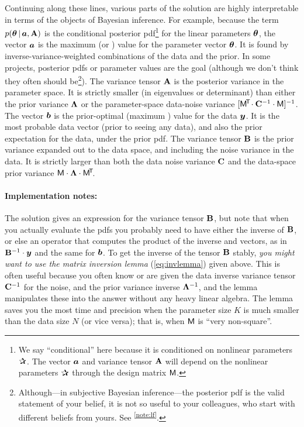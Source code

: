 Continuing along these lines,
various parts of the solution are highly interpretable in terms of the
objects of Bayesian inference. For example, because the term $p(\boldsymbol{\theta}\,|\,
\boldsymbol{a},\mathbf{A})$ is the conditional posterior pdf\footnote{We say ``conditional'' here
  because it is conditioned on nonlinear parameters $\bP$.
  The vector $\boldsymbol{a}$ and variance tensor
  $\mathbf{A}$ will depend on the nonlinear parameters $\bP$ through the design matrix
  $\mathsf{M}$.} for the linear parameters $\boldsymbol{\theta}$, the vector $\boldsymbol{a}$ is the maximum
 (or ) value for the parameter vector
$\boldsymbol{\theta}$.
It is found by inverse-variance-weighted combinations of the data and the prior.
In some projects, posterior pdfs or  parameter values are the goal
(although we don't think they often should be\footnote{Although---in subjective
  Bayesian inference---the posterior pdf
  is the valid statement of your belief, it is not so useful to your colleagues,
  who start with different beliefs from yours. See \notename\textsuperscript{\ref{note:lf}}.}).
The variance tensor $\mathbf{A}$ is the posterior variance in the parameter space.
It is strictly smaller (in eigenvalues or determinant) than either
the prior variance $\mathbf{\Lambda}$ or the parameter-space data-noise
variance $[\mathsf{M}^{\!\mathsf{T}\!}\cdot\mathbf{C}^{-1}\cdot\mathsf{M}]^{-1}$.
The vector $\boldsymbol{b}$ is the prior-optimal (maximum )
value for the data $\boldsymbol{y}$.
It is the most probable data vector (prior to seeing any data),
and also the prior expectation for the data,
under the prior pdf.
The variance tensor $\mathbf{B}$ is the prior variance expanded out to the
data space, and including the noise variance in the data.
It is strictly larger than both the data noise variance $\mathbf{C}$ and the
data-space prior variance $\mathsf{M}\cdot\mathbf{\Lambda}\cdot\mathsf{M}^{\!\mathsf{T}\!}$.


\paragraph{Implementation notes:}
The solution gives an expression for the variance tensor $\mathbf{B}$, but
note that when you actually evaluate the pdfs you probably need to
have either the inverse of $\mathbf{B}$, or else an operator that computes
the product of the inverse and vectors, as in $\mathbf{B}^{-1}\cdot\boldsymbol{y}$ and
the same for $\boldsymbol{b}$.
To get the inverse of the tensor $\mathbf{B}$ stably, \emph{you might want to use
the matrix inversion lemma} (\ref{eq:invlemma}) given above.
This is often useful because you often know or are given the data inverse variance
tensor $\mathbf{C}^{-1}$ for the noise, and the prior variance inverse
$\mathbf{\Lambda}^{-1}$, and the lemma manipulates these into the answer without
any heavy linear algebra.
The lemma saves you the most time and precision when the parameter size $K$
is much smaller than the data size $N$ (or vice versa); that is, when $\mathsf{M}$
is ``very non-square''.

